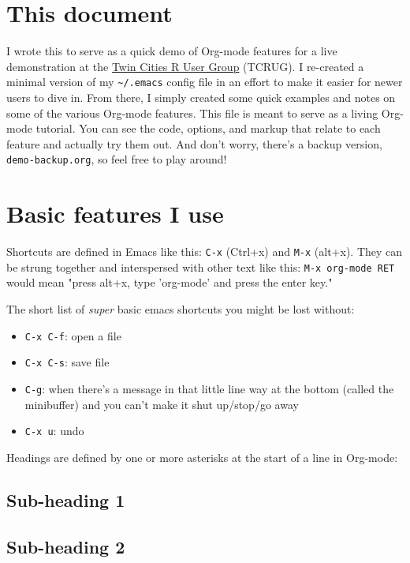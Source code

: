 \documentclass[11pt]{article}
\begin{document}
\section*{This document}
\label{sec:orgheadline2}

I wrote this to serve as a quick demo of Org-mode features for a live demonstration at the
\href{http://www.meetup.com/twincitiesrug/}{Twin Cities R User Group} (TCRUG). I re-created a minimal version of my \texttt{\textasciitilde{}/.emacs} config
file in an effort to make it easier for newer users to dive in. From there, I simply
created some quick examples and notes on some of the various Org-mode features. This file
is meant to serve as a living Org-mode tutorial. You can see the code, options, and
markup that relate to each feature and actually try them out. And don't worry, there's a
backup version, \texttt{demo-backup.org}, so feel free to play around! 

\section*{Basic features I use}
\label{sec:orgheadline17}

Shortcuts are defined in Emacs like this: \texttt{C-x} (Ctrl+x) and \texttt{M-x} (alt+x). They can be
strung together and interspersed with other text like this: \texttt{M-x org-mode RET} would mean
"press alt+x, type 'org-mode' and press the enter key."

The short list of \emph{super} basic emacs shortcuts you might be lost without:
\begin{itemize}
\item \texttt{C-x C-f}: open a file
\item \texttt{C-x C-s}: save file
\item \texttt{C-g}: when there's a message in that little line way at the bottom (called the
minibuffer) and you can't make it shut up/stop/go away
\item \texttt{C-x u}: undo
\end{itemize}

Headings are defined by one or more asterisks at the start of a line in Org-mode:
\subsection*{Sub-heading 1}
\label{sec:orgheadline3}
\subsection*{Sub-heading 2}
\label{sec:orgheadline4}
\end{document}
